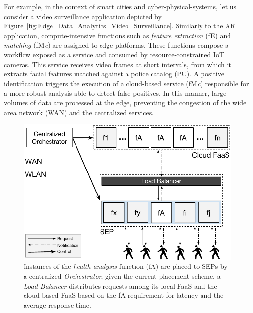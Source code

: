 \documentclass[letterpaper, 10 pt, conference]{ieeeconf}  %
\begin{document}
For example, in the context of smart cities and cyber-physical-systems, let us consider a video surveillance application depicted by Figure~\ref{fig:Edge_Data_Analytics_Video_Surveillance}. Similarly to the AR application, compute-intensive functions such as \textit{feature extraction} (fE) and \textit{matching} (fM\textit{e}) are assigned to edge platforms.
These functions compose a workflow exposed as a service and consumed by resource-constrained IoT cameras. This service receives video frames at short intervals, from which it extracts facial features matched against a police catalog (PC). A positive identification triggers the execution of a cloud-based service (fM\textit{c}) responsible for a more robust analysis able to detect false positives. In this manner, large volumes of data are processed at the edge, preventing the congestion of the wide area network (WAN) and the centralized services.

\begin{figure}[tbp]
	\centering
	\includegraphics[width=\linewidth]{Figs/Edge_Data_Analytics_Personal_Assistant.pdf}
	\caption{Instances of the \textit{health analysis} function (fA) are placed to SEPs by a centralized \textit{Orchestrator}; given the current placement scheme, a \textit{Load Balancer} distributes requests among its local FaaS and the cloud-based FaaS based on the fA requirement for latency and the average response time.}
	\label{fig:Edge_Data_Analytics_Personal_Assistant}
\end{figure}
\end{document}
